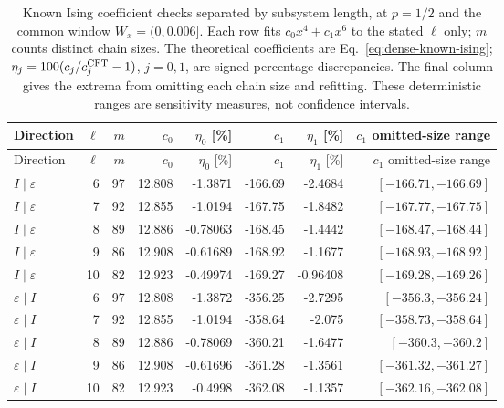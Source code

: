 \begingroup\setlength{\tabcolsep}{3pt}
\begin{longtable}{lrrrrrrr}
\caption{Known Ising coefficient checks separated by subsystem length, at $p=1/2$ and the common window $W_x=(0,0.006]$. Each row fits $c_0x^4+c_1x^6$ to the stated $\ell$ only; $m$ counts distinct chain sizes. The theoretical coefficients are Eq.~\eqref{eq:dense-known-ising}; $\eta_j=100(c_j/c_j^{\rm CFT}-1)$, $j=0,1$, are signed percentage discrepancies. The final column gives the extrema from omitting each chain size and refitting. These deterministic ranges are sensitivity measures, not confidence intervals.}
\label{tab:dense-subsystem}\\\toprule
Direction & $\ell$ & $m$ & $c_0$ & $\eta_0$ [\%] & $c_1$ & $\eta_1$ [\%] & $c_1$ omitted-size range\\\midrule
\endfirsthead
\toprule
Direction & $\ell$ & $m$ & $c_0$ & $\eta_0$ [\%] & $c_1$ & $\eta_1$ [\%] & $c_1$ omitted-size range\\\midrule
\endhead
\bottomrule\endfoot
$I\mid \varepsilon$ & 6 & 97 & 12.808 & -1.3871 & -166.69 & -2.4684 & $[-166.71,-166.69]$\\
$I\mid \varepsilon$ & 7 & 92 & 12.855 & -1.0194 & -167.75 & -1.8482 & $[-167.77,-167.75]$\\
$I\mid \varepsilon$ & 8 & 89 & 12.886 & -0.78063 & -168.45 & -1.4442 & $[-168.47,-168.44]$\\
$I\mid \varepsilon$ & 9 & 86 & 12.908 & -0.61689 & -168.92 & -1.1677 & $[-168.93,-168.92]$\\
$I\mid \varepsilon$ & 10 & 82 & 12.923 & -0.49974 & -169.27 & -0.96408 & $[-169.28,-169.26]$\\
$\varepsilon\mid I$ & 6 & 97 & 12.808 & -1.3872 & -356.25 & -2.7295 & $[-356.3,-356.24]$\\
$\varepsilon\mid I$ & 7 & 92 & 12.855 & -1.0194 & -358.64 & -2.075 & $[-358.73,-358.64]$\\
$\varepsilon\mid I$ & 8 & 89 & 12.886 & -0.78069 & -360.21 & -1.6477 & $[-360.3,-360.2]$\\
$\varepsilon\mid I$ & 9 & 86 & 12.908 & -0.61696 & -361.28 & -1.3561 & $[-361.32,-361.27]$\\
$\varepsilon\mid I$ & 10 & 82 & 12.923 & -0.4998 & -362.08 & -1.1357 & $[-362.16,-362.08]$\\
\end{longtable}
\endgroup

